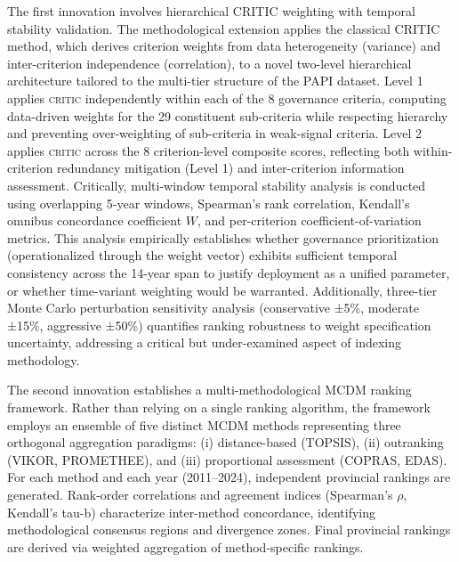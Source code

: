 \documentclass[12pt,a4paper]{article}
\newcommand{\CRITIC}{\textsc{critic}\xspace}
\begin{document}
The first innovation involves hierarchical CRITIC weighting with temporal stability validation. The methodological extension applies the classical CRITIC method, which derives criterion weights from data heterogeneity (variance) and inter-criterion independence (correlation), to a novel two-level hierarchical architecture tailored to the multi-tier structure of the PAPI dataset. Level 1 applies \CRITIC independently within each of the 8 governance criteria, computing data-driven weights for the 29 constituent sub-criteria while respecting hierarchy and preventing over-weighting of sub-criteria in weak-signal criteria. Level 2 applies \CRITIC across the 8 criterion-level composite scores, reflecting both within-criterion redundancy mitigation (Level 1) and inter-criterion information assessment. Critically, multi-window temporal stability analysis is conducted using overlapping 5-year windows, Spearman's rank correlation, Kendall's omnibus concordance coefficient $W$, and per-criterion coefficient-of-variation metrics. This analysis empirically establishes whether governance prioritization (operationalized through the weight vector) exhibits sufficient temporal consistency across the 14-year span to justify deployment as a unified parameter, or whether time-variant weighting would be warranted. Additionally, three-tier Monte Carlo perturbation sensitivity analysis (conservative ±5\%, moderate ±15\%, aggressive ±50\%) quantifies ranking robustness to weight specification uncertainty, addressing a critical but under-examined aspect of indexing methodology.

The second innovation establishes a multi-methodological MCDM ranking framework. Rather than relying on a single ranking algorithm, the framework employs an ensemble of five distinct MCDM methods representing three orthogonal aggregation paradigms: (i) distance-based (TOPSIS), (ii) outranking (VIKOR, PROMETHEE), and (iii) proportional assessment (COPRAS, EDAS). For each method and each year (2011--2024), independent provincial rankings are generated. Rank-order correlations and agreement indices (Spearman's $\rho$, Kendall's tau-b) characterize inter-method concordance, identifying methodological consensus regions and divergence zones. Final provincial rankings are derived via weighted aggregation of method-specific rankings.
\end{document}

